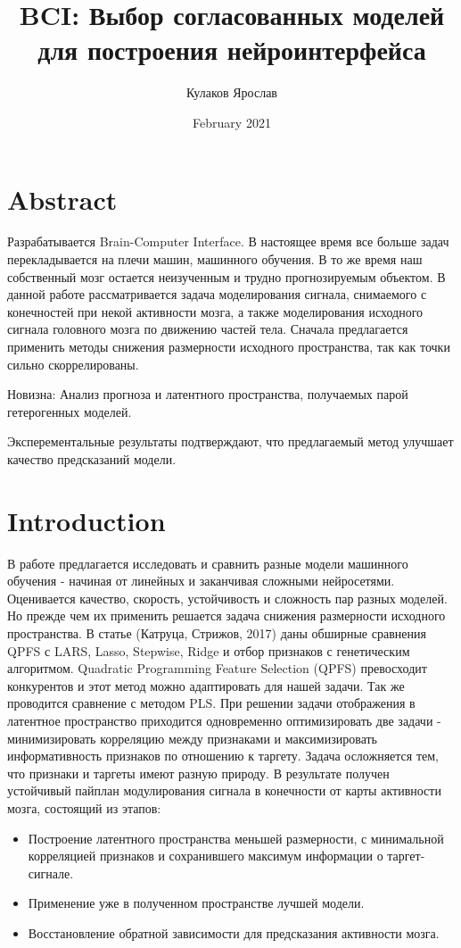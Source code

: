 \documentclass{article}
\title{BCI: Выбор согласованных моделей для построения нейроинтерфейса}
\author{Кулаков Ярослав}
\date{February 2021}
\begin{document}
\maketitle

\section{Abstract}
Разрабатывается Brain-Computer Interface. В настоящее время все больше задач перекладывается на плечи машин, машинного обучения. В то же время наш собственный мозг остается неизученным и трудно прогнозируемым объектом. В данной работе рассматривается задача моделирования сигнала, снимаемого с конечностей при некой активности мозга, а также моделирования исходного сигнала головного мозга по движению частей тела. Сначала предлагается применить методы снижения размерности исходного пространства, так как точки сильно скоррелированы.

Новизна: Анализ прогноза и латентного пространства, получаемых парой гетерогенных моделей.

Эксперементальные результаты подтверждают, что предлагаемый метод улучшает качество предсказаний модели.

\section{Introduction}
В работе предлагается исследовать и сравнить разные модели машинного обучения - начиная от линейных и заканчивая сложными нейросетями. Оценивается качество, скорость, устойчивость и сложность пар разных моделей. Но прежде чем их применить решается задача снижения размерности исходного пространства. В статье (Катруца, Стрижов, 2017) даны обширные сравнения QPFS с LARS, Lasso, Stepwise, Ridge и отбор признаков с генетическим алгоритмом. Quadratic Programming Feature Selection (QPFS) превосходит конкурентов и этот метод можно адаптировать для нашей задачи. Так же проводится сравнение с методом PLS.  При решении задачи отображения в латентное пространство приходится одновременно оптимизировать две задачи - минимизировать корреляцию между признаками и максимизировать информативность 
признаков по отношению к таргету. Задача осложняется тем, что признаки и таргеты имеют разную природу. 
В результате получен устойчивый пайплан модулирования сигнала в конечности от карты активности мозга, состоящий из этапов:
\begin{itemize}
    \item Построение латентного пространства меньшей размерности, с минимальной корреляцией признаков и сохранившего максимум информации о таргет-сигнале.
    \item Применение уже в полученном пространстве лучшей модели.
     \item Восстановление обратной зависимости для предсказания активности мозга.
\end{itemize}
\end{document}
